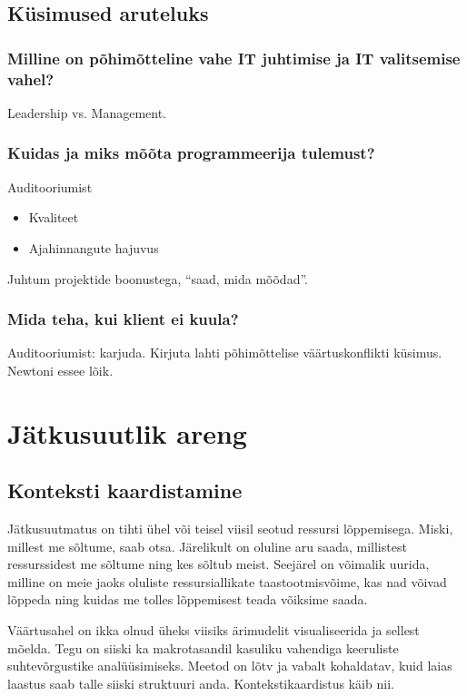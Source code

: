 \documentclass{tufte-book}
\begin{document}
\section{Küsimused aruteluks}
\subsection{Milline on põhimõtteline vahe IT juhtimise ja IT valitsemise vahel?}
Leadership vs. Management.

\subsection{Kuidas ja miks mõõta programmeerija tulemust?}
Auditooriumist
\begin{itemize}
	\item Kvaliteet
	\item Ajahinnangute hajuvus
\end{itemize}

Juhtum projektide boonustega, \enquote{saad, mida mõõdad}.

\subsection{Mida teha, kui klient ei kuula?}
Auditooriumist: karjuda. Kirjuta lahti põhimõttelise väärtuskonflikti küsimus. Newtoni essee lõik. 

\chapter{Jätkusuutlik areng}
\section{Konteksti kaardistamine}
Jätkusuutmatus on tihti ühel või teisel viisil seotud ressursi lõppemisega. Miski, millest me sõltume, saab otsa. Järelikult on oluline aru saada, millistest ressurssidest me sõltume ning kes sõltub meist. Seejärel on võimalik uurida, milline on meie jaoks oluliste ressursiallikate taastootmisvõime, kas nad võivad lõppeda ning kuidas me tolles lõppemisest teada võiksime saada.

Väärtusahel on ikka olnud üheks viisiks ärimudelit visualiseerida ja sellest mõelda. Tegu on siiski ka makrotasandil kasuliku vahendiga keeruliste suhtevõrgustike analüüsimiseks. Meetod on lõtv ja vabalt kohaldatav, kuid laias laastus saab talle siiski struktuuri anda. Kontekstikaardistus käib nii. 
\end{document}
